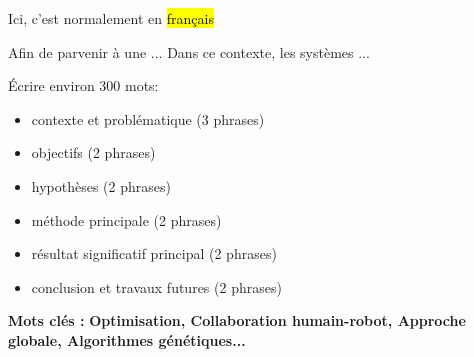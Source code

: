 \begin{resume}

Ici, c'est normalement en \hl{français}

Afin de parvenir à une ... Dans ce contexte, les systèmes ... \par

Écrire environ 300 mots:
\begin{itemize}
\item contexte et problématique (3 phrases)
\item objectifs (2 phrases) 
\item hypothèses (2 phrases)
\item méthode principale (2 phrases) 
\item résultat significatif principal (2 phrases) 
\item conclusion et travaux futures (2 phrases) 
\end{itemize}

\textbf{Mots clés :} \textbf{Optimisation, Collaboration humain-robot, Approche globale, Algorithmes génétiques...}


\end{resume}

